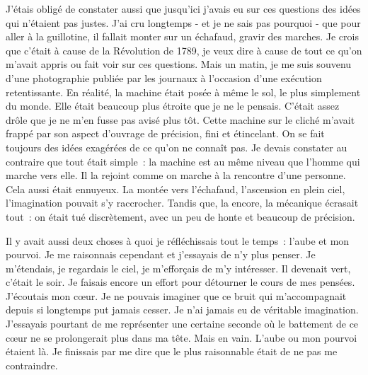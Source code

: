 \documentclass[french,twoside]{book} %
\begin{document}
J'étais obligé de constater aussi que jusqu’ici j’avais eu sur ces questions des idées qui n’étaient pas justes. J'ai cru longtemps - et je ne sais pas pourquoi - que pour aller à la guillotine, il fallait monter sur un échafaud, gravir des marches. Je crois que c’était à cause de la Révolution de 1789, je veux dire à cause de tout ce qu’on m’avait appris ou fait voir sur ces questions. Mais un matin, je me suis souvenu d’une photographie publiée par les journaux à l’occasion d’une exécution retentissante. En réalité, la machine était posée à même le sol, le plus simplement du monde. Elle était beaucoup plus étroite que je ne le pensais. C'était assez drôle que je ne m’en fusse pas avisé plus tôt. Cette machine sur le cliché m’avait frappé par son aspect d’ouvrage de précision, fini et étincelant. On se fait toujours des idées exagérées de ce qu’on ne connaît pas. Je devais constater au contraire que tout était simple : la machine est au même niveau que l’homme qui marche vers elle. Il la rejoint comme on marche à la rencontre d’une personne. Cela aussi était ennuyeux. La montée vers l’échafaud, l’ascension en plein ciel, l’imagination pouvait s’y raccrocher. Tandis que, la encore, la mécanique écrasait tout : on était tué discrètement, avec un peu de honte et beaucoup de précision.\par
Il y avait aussi deux choses à quoi je réfléchissais tout le temps : l’aube et mon pourvoi. Je me raisonnais cependant et j’essayais de n’y plus penser. Je m’étendais, je regardais le ciel, je m’efforçais de m’y intéresser. Il devenait vert, c’était le soir. Je faisais encore un effort pour détourner le cours de mes pensées. J'écoutais mon cœur. Je ne pouvais imaginer que ce bruit qui m’accompagnait depuis si longtemps put jamais cesser. Je n’ai jamais eu de véritable imagination. J'essayais pourtant de me représenter une certaine seconde où le battement de ce cœur ne se prolongerait plus dans ma tête. Mais en vain. L'aube ou mon pourvoi étaient là. Je finissais par me dire que le plus raisonnable était de ne pas me contraindre.\par
\end{document}
